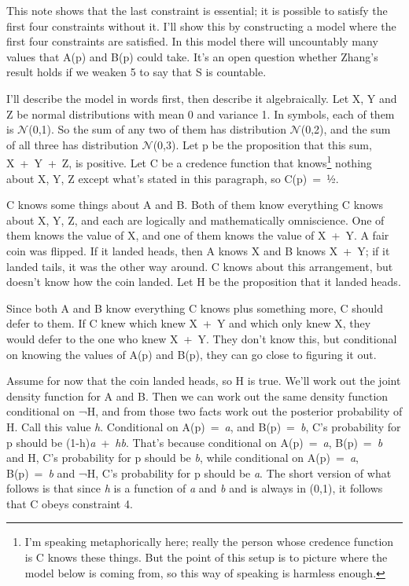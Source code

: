 \documentclass[
  10pt,
  letterpaper,
  DIV=11,
  numbers=noendperiod,
  twoside]{scrartcl}
\begin{document}
This note shows that the last constraint is essential; it is possible to
satisfy the first four constraints without it. I'll show this by
constructing a model where the first four constraints are satisfied. In
this model there will uncountably many values that A(p) and B(p) could
take. It's an open question whether Zhang's result holds if we weaken 5
to say that S is countable.

I'll describe the model in words first, then describe it algebraically.
Let X, Y and Z be normal distributions with mean 0 and variance 1. In
symbols, each of them is \(\mathcal{N}\)(0,1). So the sum of any two of
them has distribution \(\mathcal{N}\)(0,2), and the sum of all three has
distribution \(\mathcal{N}\)(0,3). Let p be the proposition that this
sum, X~+~Y~+~Z, is positive. Let C be a credence function that
knows\footnote{I'm speaking metaphorically here; really the person whose
  credence function is C knows these things. But the point of this setup
  is to picture where the model below is coming from, so this way of
  speaking is harmless enough.} nothing about X, Y, Z except what's
stated in this paragraph, so C(p)~=~½.

C knows some things about A and B. Both of them know everything C knows
about X, Y, Z, and each are logically and mathematically omniscience.
One of them knows the value of X, and one of them knows the value of
X~+~Y. A fair coin was flipped. If it landed heads, then A knows X and B
knows X~+~Y; if it landed tails, it was the other way around. C knows
about this arrangement, but doesn't know how the coin landed. Let H be
the proposition that it landed heads.

Since both A and B know everything C knows plus something more, C should
defer to them. If C knew which knew X~+~Y and which only knew X, they
would defer to the one who knew X~+~Y. They don't know this, but
conditional on knowing the values of A(p) and B(p), they can go close to
figuring it out.

Assume for now that the coin landed heads, so H is true. We'll work out
the joint density function for A and B. Then we can work out the same
density function conditional on ¬H, and from those two facts work out
the posterior probability of H. Call this value \emph{h}. Conditional on
A(p)~=~\emph{a}, and B(p)~=~\emph{b}, C's probability for p should be
(1-h)\emph{a}~+~\emph{hb}. That's because conditional on
A(p)~=~\emph{a}, B(p)~=~\emph{b} and H, C's probability for p should be
\emph{b}, while conditional on A(p)~=~\emph{a}, B(p)~=~\emph{b} and ¬H,
C's probability for p should be \emph{a}. The short version of what
follows is that since \emph{h} is a function of \emph{a} and \emph{b}
and is always in (0,1), it follows that C obeys constraint 4.
\end{document}
